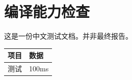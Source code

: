 \documentclass[UTF8]{ctexart}
\begin{document}
\section{编译能力检查}
这是一份中文测试文档。并非最终报告。
\begin{tabular}{ll}\toprule 项目 & 数据 \\ \midrule 测试 & 100ms \\ \bottomrule\end{tabular}
\end{document}
